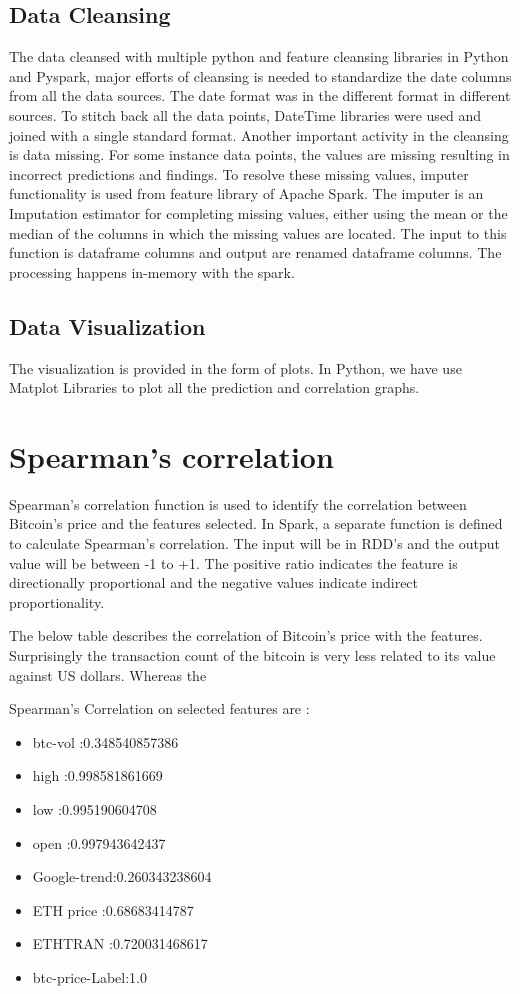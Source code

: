 \documentclass[sigconf]{acmart}
\begin{document}
\subsection{Data Cleansing}
The data cleansed with multiple python and feature cleansing libraries in Python and Pyspark, major efforts of cleansing is needed to standardize the date columns from all the data sources. The date format was in the different format in different sources. To stitch back all the data points, DateTime libraries were used and joined with a single standard format. Another important activity in the cleansing is data missing. For some instance data points, the values are missing resulting in incorrect predictions and findings. To resolve these missing values, imputer functionality is used from feature library of Apache Spark. The imputer is an Imputation estimator for completing missing values, either using the mean or the median of the columns in which the missing values are located. The input to this function is dataframe columns and output are renamed dataframe columns. The processing happens in-memory with the spark.

\subsection{Data Visualization}
The visualization is provided in the form of plots. In Python, we have use Matplot Libraries to plot all the prediction and correlation graphs.

\section{Spearman's correlation}
Spearman's correlation function is used to identify the correlation between Bitcoin's price and the features selected. In Spark, a separate function is defined to calculate Spearman's correlation. The input will be in RDD's and the output value will be between -1 to +1. The positive ratio indicates the feature is directionally proportional and the negative values indicate indirect proportionality.

The below table describes the correlation of Bitcoin's price with the features. Surprisingly the transaction count of the bitcoin is very less related to its value against US dollars. Whereas the

Spearman's Correlation on selected features are :
\begin{itemize}
\item btc-vol     :0.348540857386 
\item high        :0.998581861669 
\item low         :0.995190604708 
\item open        :0.997943642437  
\item Google-trend:0.260343238604  
\item ETH price   :0.68683414787  
\item ETHTRAN     :0.720031468617
\item btc-price-Label:1.0 
\end{itemize}
\end{document}
